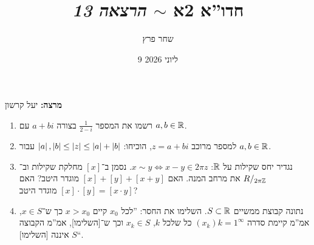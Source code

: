 \documentclass[]{../../../../tex/classes/styledArticle}
\date{9 ליוני 2026}
\author{שחר פרץ}
\title{חדו''א 2א $\sim$ \textit{הרצאה 13}}
\begin{document}
	\maketitle
	\textbf{מרצה: }יעל קרשון
	\begin{Exercise}[פתיחה]
		\begin{enumerate}
			\item רשמו את המספר $\frac{1}{2 - i}$ בצורה $a + bi$ עם $a, b \in \mathbb{R}$. 
			\item למספר מרוכב $z = a + bi$, הוכיחו: $\left \lvert a \right \rvert, \left \lvert b \right \rvert \le \left \lvert z \right \rvert \le \left \lvert a \right \rvert + \left \lvert b \right \rvert$ עבור $a, b \in \mathbb{R}$. 
			\item נגדיר יחס שקילות על $\mathbb{R}$: $x \sim y \iff x - y \in 2 \pi z$. נסמן ב־$[x]$ מחלקת שקילות וב־$R/_{2 \pi \mathbb{Z}}$ את מרחב המנה. האם $[x] + [y] + [x + y]$ מוגדר היטב? האם $[x] \cdot [y] = [x \cdot y]$ מוגדר היטב? 
			\item נתונה קבוצת ממשיים $S \subset \mathbb{R}$. השלימו את החסר: ''לכל $x_0$ קיים $x > x_0$ כך ש־$x \in S$, אמ''מ קיימת סדרה $(x_k){k = 1}^{\infty}$ כל שלכל $k$, $x_k \in S$ וכך ש־[השלימו], אמ''מ הקבוצה $S$ איננה [השלימו]``. 
		\end{enumerate}
	\end{Exercise}
	
\end{document}
